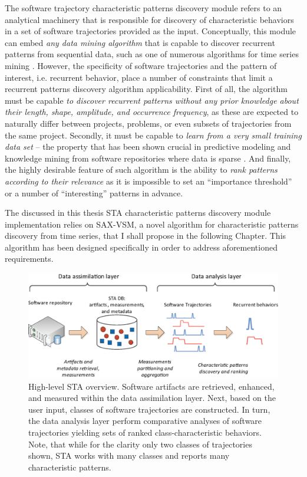 The software trajectory characteristic patterns discovery module refers to an analytical machinery that 
is responsible for discovery of characteristic behaviors in a set of software trajectories provided as the input.
Conceptually, this module can embed \textit{any data mining algorithm} that is capable to discover 
recurrent patterns from sequential data, such as one of numerous algorithms for time series mining \cite{citeulike:10358271}.
However, the specificity of software trajectories and the pattern of interest, i.e. recurrent behavior, 
place a number of constraints that limit a recurrent patterns discovery algorithm applicability.
First of all, the algorithm must be capable \textit{to discover recurrent patterns without any prior knowledge 
about their length, shape, amplitude, and occurrence frequency}, as these are expected to naturally differ 
between projects, problems, or even subsets of trajectories from the same project.
Secondly, it must be capable to \textit{learn from a very small training data set} --
the property that has been shown crucial in predictive modeling and knowledge mining from software 
repositories where data is sparse \cite{citeulike:6055293}.
And finally, the highly desirable feature of such algorithm is the ability to \textit{rank patterns according 
to their relevance} as it is impossible to set an ``importance threshold'' or a number of ``interesting''
patterns in advance.

The discussed in this thesis STA characteristic patterns discovery module implementation relies on SAX-VSM,
a novel algorithm for characteristic patterns discovery from time series, that I shall propose in the 
following Chapter. This algorithm has been designed specifically in order to address aforementioned requirements.

\begin{figure}[t]
   \centering
   \includegraphics[width=150mm]{figures/Flow-analysis.eps}
   \caption{High-level STA overview. Software artifacts are retrieved, enhanced, and measured within the
   data assimilation layer. Next, based on the user input, classes of software trajectories are constructed.   
   In turn, the data analysis layer perform comparative analyses of software trajectories yielding sets
   of ranked class-characteristic behaviors.
   Note, that while for the clarity only two classes of trajectories shown, STA works with many classes and 
   reports many characteristic patterns.}
   \label{fig:sta-full-overview}
\end{figure}

